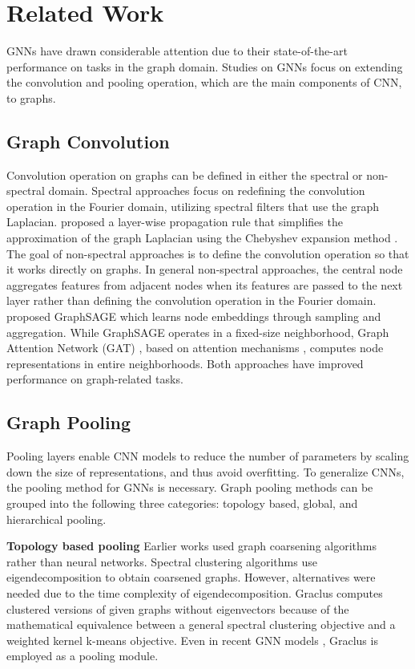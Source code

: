 \documentclass{article}
\begin{document}
\section{Related Work}
\label{related}
GNNs have drawn considerable attention due to their state-of-the-art performance on tasks in the graph domain. Studies on GNNs focus on extending the convolution and pooling operation, which are the main components of CNN, to graphs. 

\subsection{Graph Convolution} 
\label{related:graphconvolution}
Convolution operation on graphs can be defined in either the spectral or non-spectral domain. Spectral approaches focus on redefining the convolution operation in the Fourier domain, utilizing spectral filters that use the graph Laplacian. \citeauthor{kipf2016semi} proposed a layer-wise propagation rule that simplifies the approximation of the graph Laplacian using the Chebyshev expansion method \cite{defferrard2016convolutional}.
The goal of non-spectral approaches is to define the convolution operation so that it works directly on graphs. In general non-spectral approaches, the central node aggregates features from adjacent nodes when its features are passed to the next layer rather than defining the convolution operation in the Fourier domain. \citeauthor{hamilton2017inductive} proposed GraphSAGE which learns node embeddings through sampling and aggregation. While GraphSAGE operates in a fixed-size neighborhood, Graph Attention Network (GAT) \cite{veličković2018graph}, based on attention mechanisms \cite{DBLP:journals/corr/BahdanauCB14}, computes node representations in entire neighborhoods. Both approaches have improved performance on graph-related tasks. 

\subsection{Graph Pooling}
Pooling layers enable CNN models to reduce the number of parameters by scaling down the size of representations, and thus avoid overfitting. To generalize CNNs, the pooling method for GNNs is necessary. Graph pooling methods can be grouped into the following three categories: topology based, global, and hierarchical pooling.

\textbf{Topology based pooling}
Earlier works used graph coarsening algorithms rather than neural networks. Spectral clustering algorithms use eigendecomposition to obtain coarsened graphs. However, alternatives were needed due to the time complexity of eigendecomposition. Graclus\cite{graclus} computes clustered versions of given graphs without eigenvectors because of the mathematical equivalence between a general spectral clustering objective and a weighted kernel k-means objective. Even in recent GNN models \cite{defferrard2016convolutional,ijcai2018-490}, Graclus is employed as a pooling module. 
\end{document}
